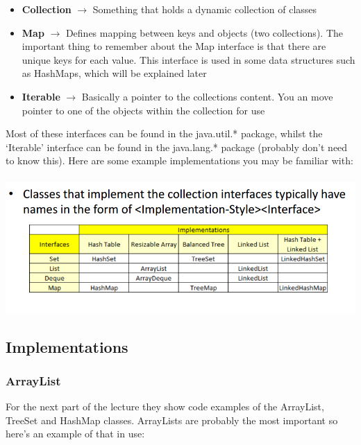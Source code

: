 \documentclass{article}
\begin{document}
\begin{itemize}
    \item \textbf{Collection} $\longrightarrow$ Something that holds a dynamic collection of classes
    \item \textbf{Map} $\longrightarrow$ Defines mapping between keys and objects (two collections). The important thing to remember about the Map interface is that there are unique keys for each value. This interface is used in some data structures such as HashMaps, which will be explained later
    \item \textbf{Iterable} $\longrightarrow$ Basically a pointer to the collections content. You an move pointer to one of the objects within the collection for use
\end{itemize}

Most of these interfaces can be found in the java.util.* package, whilst the `Iterable' interface can be found in the java.lang.* package (probably don't need to know this). Here are some example implementations you may be familiar with:
\\\\
\includegraphics[scale = 0.65]{jcfImplementations}
\newpage
\subsection{Implementations}
\subsubsection{ArrayList}
For the next part of the lecture they show code examples of the ArrayList, TreeSet and HashMap classes. ArrayLists are probably the most important so here's an example of that in use:
\end{document}

